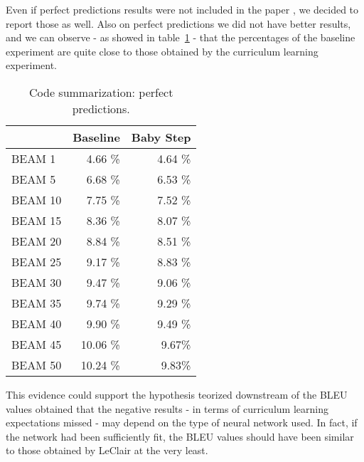 Even if perfect predictions results were not included in the paper \cite{Leclair2020}, we decided to report
those as well. Also on perfect predictions we did not have better results, and we can observe - as showed in table~\ref{table:2} - that the
percentages of the baseline experiment are quite close to those obtained by the curriculum learning experiment.
\begin{table}[h!]
    \centering
    \begin{tabular}{l|r|r} 
    & Baseline & Baby Step\\ [0.5ex] 
    \hline
    BEAM 1 & 4.66 \% & 4.64 \%\\  
    BEAM 5 & 6.68 \% & 6.53 \% \\ 
    BEAM 10 & 7.75 \% & 7.52 \%\\
    BEAM 15 & 8.36 \% & 8.07 \%\\
    BEAM 20 & 8.84 \% & 8.51 \%\\
    BEAM 25 & 9.17 \% & 8.83 \%\\
    BEAM 30 & 9.47 \% & 9.06 \%\\
    BEAM 35 & 9.74 \% & 9.29 \%\\
    BEAM 40 & 9.90 \% & 9.49 \%\\
    BEAM 45 & 10.06 \%& 9.67\%\\
    BEAM 50 & 10.24 \%& 9.83\%\\ [1ex]
    \end{tabular}
    \caption{Code summarization: perfect predictions.}
    \label{table:2}
\end{table}
This evidence could support the hypothesis teorized downstream of the BLEU values obtained 
that the negative results - in terms of curriculum learning 
expectations missed - may depend on the type of neural network used. 
In fact, if the network had been sufficiently 
fit, the BLEU values should have been similar to those obtained by LeClair \cite{Leclair2020} at the very least.


